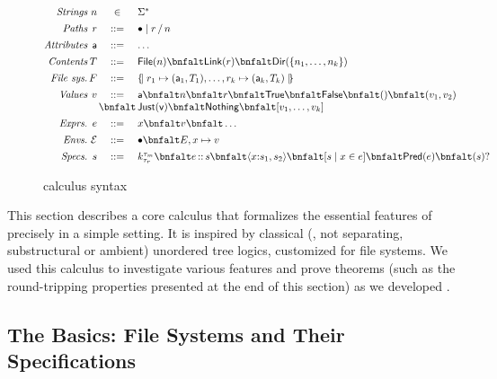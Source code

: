 \begin{figure}
\[
\begin{array}{@{}r@{\,}r@{\,}c@{\,}l}
\textit{Strings}        & n & \in & \Sigma^{\ast} \\[1ex]
\textit{Paths}          & r & \bnfdef & \PNil \mid \PCons{r}{n} \\[1ex]
\textit{Attributes}     & \att  & \bnfdef & \dots\\[1ex]
\textit{Contents}       & T  & \bnfdef & \File{n} \bnfalt \Link{r} \bnfalt \Dir{ \Set{n_1,\dots,n_k} }\\[1ex]
\textit{File sys.}      & F & \bnfdef & \Map{ r_1 \mapsto (\att_1,T_1), \dots, r_k \mapsto (\att_k,T_k) }\\[1ex]
\textit{Values}         & v & \bnfdef & \att \bnfalt n \bnfalt r \bnfalt \True \bnfalt \False \bnfalt () \bnfalt (v_1,v_2) \\
                        &   & \bnfalt & \Just{v} \bnfalt \Nothing \bnfalt \List{v_1,\dots,v_k}\\[1ex]
\textit{Exprs.}         & e & \bnfdef & x \bnfalt v \bnfalt \dots \\[1ex]
\textit{Envs.}          & \Env & \bnfdef & \ENil \bnfalt E,x\mapsto v \\[1ex]
\textit{Specs.}         & s & \bnfdef & \Sk 
                              \bnfalt \SPath{e}{s}
                              \bnfalt \SPair{x}{s_1}{s_2} 
                              \bnfalt \SComp{s}{x}{e}
                              \bnfalt \SPred{e}
                              \bnfalt \SOption{s}
\end{array}
\]
\label{fig:calculus-syntax}
\caption{\forest{} calculus syntax}
\end{figure}

This section describes a core calculus that formalizes the essential
features of \forest{} precisely in a simple setting. It is inspired by
classical (\ie{}, not separating, substructural or ambient) unordered
tree logics, customized for file systems. We used this calculus to
investigate various features and prove theorems (such as the
round-tripping properties presented at the end of this section) as we
developed \forest{}.

\subsection{The Basics: File Systems and Their Specifications}

